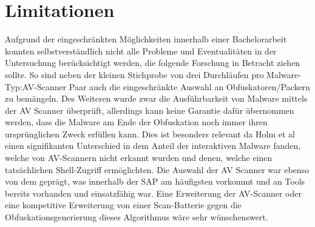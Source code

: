 \section{Limitationen}
Aufgrund der eingeschränkten Möglichkeiten innerhalb einer Bachelorarbeit konnten selbstverständlich nicht alle Probleme und Eventualitäten in der Untersuchung berücksichtigt werden, die folgende Forschung in Betracht ziehen sollte.
So sind neben der kleinen Stichprobe von drei Durchläufen pro Malware-Typ:AV-Scanner Paar auch die eingeschränkte Auswahl an Obfuskatoren/Packern zu bemängeln. Des Weiteren wurde zwar die Ausführbarkeit von Malware mittels der AV Scanner überprüft, allerdings kann keine Garantie dafür übernommen werden, dass die Malware am Ende der Obfuskation noch immer ihren ursprünglichen Zweck erfüllen kann. Dies ist besonders relevant da Holm et al \cite{holm_2023_hide} einen signifikanten Unterschied in dem Anteil der interaktiven Malware fanden, welche von AV-Scannern nicht erkannt wurden und denen, welche einen tatsächlichen Shell-Zugriff ermöglichten.
Die Auswahl der AV Scanner war ebenso von dem geprägt, was innerhalb der SAP am häufigsten vorkommt und an Tools bereits vorhanden und einsatzfähig war. Eine Erweiterung der AV-Scanner oder eine kompetitive Erweiterung von einer Scan-Batterie gegen die Obfuskationsgenerierung dieses Algorithmus wäre sehr wünschenswert.